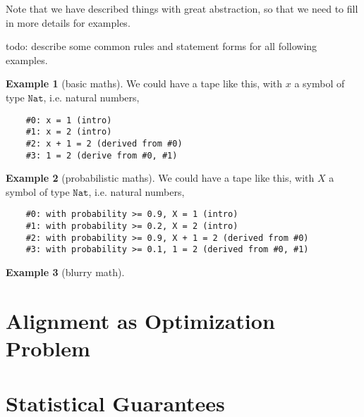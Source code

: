 \documentclass[11pt, oneside]{article}   	%
\theoremstyle{definition}
\newtheorem*{eg}{Example}
\begin{document}
Note that we have described things with great abstraction, so that we need to fill in more details for examples.

todo: describe some common rules and statement forms for all following examples.

\begin{eg}[basic maths] We could have a tape like this, with $x$ a symbol of type $\texttt{Nat}$, i.e. natural numbers,
\begin{verbatim}
	#0: x = 1 (intro)
	#1: x = 2 (intro)
	#2: x + 1 = 2 (derived from #0)
	#3: 1 = 2 (derive from #0, #1)
\end{verbatim}
\end{eg}

\begin{eg}[probabilistic maths] We could have a tape like this, with $X$ a symbol of type $\texttt{Nat}$, i.e. natural numbers,
\begin{verbatim}
	#0: with probability >= 0.9, X = 1 (intro)
	#1: with probability >= 0.2, X = 2 (intro)
	#2: with probability >= 0.9, X + 1 = 2 (derived from #0)
	#3: with probability >= 0.1, 1 = 2 (derived from #0, #1)
\end{verbatim}
\end{eg}

\begin{eg}[blurry math]
	
\end{eg}
\section{Alignment as Optimization Problem}

\section{Statistical Guarantees}
\end{document}
